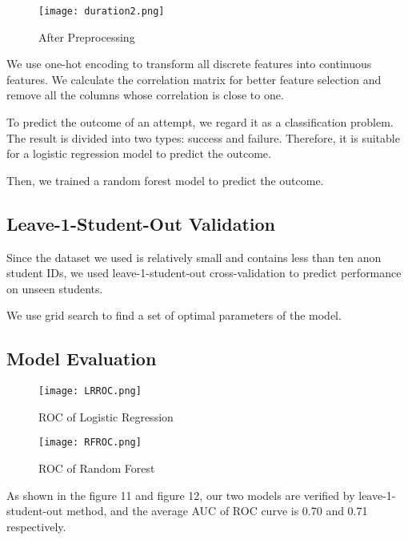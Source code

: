 \documentclass[hyperref]{ctexart}
\begin{document}
\begin{multicols}{2}
    \begin{figure}[H]
    \small
    \centering
    \texttt{[image: duration2.png]}
    \caption{After Preprocessing} \label{fig:aa}
    \end{figure}

We use one-hot encoding to transform all discrete features into continuous features. We calculate the correlation matrix for better feature selection and remove all the columns whose correlation is close to one.


To predict the outcome of an attempt, we regard it as a classification problem. The result is divided into two types: success and failure. Therefore, it is suitable for a logistic regression model to predict the outcome.


Then, we trained a random forest model to predict the outcome.

\subsection{Leave-1-Student-Out Validation}
Since the dataset we used is relatively small and contains less than ten anon student IDs, we used leave-1-student-out cross-validation to predict performance on unseen students.


We use grid search to find a set of optimal parameters of the model.
\subsection{Model Evaluation}
    \begin{figure}[H]
    \small
    \centering
    \texttt{[image: LRROC.png]}
    \caption{ROC of Logistic Regression} \label{fig:aa}
    \end{figure}

    \begin{figure}[H]
    \small
    \centering
    \texttt{[image: RFROC.png]}
    \caption{ROC of Random Forest} \label{fig:aa}
    \end{figure}
As shown in the figure 11 and figure 12, our two models are verified by leave-1-student-out method, and the average AUC of ROC curve is 0.70 and 0.71 respectively.


\end{multicols}
\end{document}
